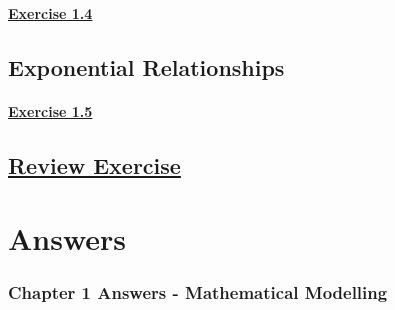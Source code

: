 \documentclass[
  11pt,
  openany]{book}
\begin{document}
\newpage

\protect{}\label{ex14q}{}

\subsubsection*{\texorpdfstring{\hyperref[ex14a]{Exercise 1.4}}{Exercise 1.4}}\label{exercise-1.4}

\newpage

\section{Exponential Relationships}\label{exponential-relationships}

\newpage

\protect{}\label{ex15q}{}

\subsubsection*{\texorpdfstring{\hyperref[ex15a]{Exercise 1.5}}{Exercise 1.5}}\label{exercise-1.5}

\newpage

\protect{}\label{re1q}{}

\section*{\texorpdfstring{\hyperref[re1a]{Review Exercise}}{Review Exercise}}\label{review-exercise}

\chapter*{Answers}\label{answers}

\raggedright

\subsection*{Chapter 1 Answers - Mathematical Modelling}\label{chapter-1-answers---mathematical-modelling}

\begingroup
\footnotesize

\protect{}\label{ex11a}{}
\end{document}
